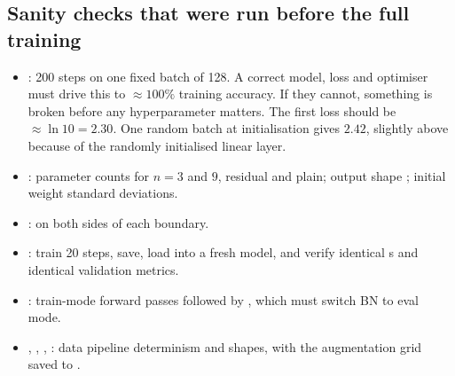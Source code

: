 \subsection{Sanity checks that were run before the full training}

\begin{repo}
\begin{itemize}[nosep]
  \item {}: 200 steps on one fixed batch of 128. A correct model, loss and optimiser must drive this to $\approx100\%$ training accuracy. If they cannot, something is broken before any hyperparameter matters. The first loss should be $\approx\ln10=2.30$. One random batch at initialisation gives $2.42$, slightly above because of the randomly initialised linear layer.
  \item {}: parameter counts for $n=3$ and $9$, residual and plain; output shape ; initial weight standard deviations.
  \item {}:  on both sides of each boundary.
  \item {}: train 20 steps, save, load into a fresh model, and verify identical s and identical validation metrics.
  \item {}: train-mode forward passes followed by , which must switch BN to eval mode.
  \item {}, , , : data pipeline determinism and shapes, with the augmentation grid saved to .
\end{itemize}
\end{repo}
